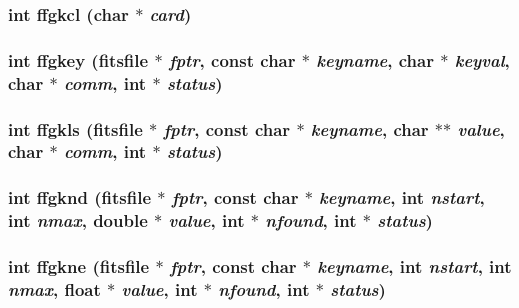 \subsubsection{\setlength{\rightskip}{0pt plus 5cm}int ffgkcl (char $\ast$ {\em card})}\label{src_2fitsio_8h_89eaf0da53af08c1e07b6940a3ebdf32}


\subsubsection{\setlength{\rightskip}{0pt plus 5cm}int ffgkey (\bf{fitsfile} $\ast$ {\em fptr}, const char $\ast$ {\em keyname}, char $\ast$ {\em keyval}, char $\ast$ {\em comm}, int $\ast$ {\em status})}\label{src_2fitsio_8h_9a92da40129953d96be3d75a06ee8b8a}


\subsubsection{\setlength{\rightskip}{0pt plus 5cm}int ffgkls (\bf{fitsfile} $\ast$ {\em fptr}, const char $\ast$ {\em keyname}, char $\ast$$\ast$ {\em value}, char $\ast$ {\em comm}, int $\ast$ {\em status})}\label{src_2fitsio_8h_ffb87d66b7458265f69a1989575b4c0c}


\subsubsection{\setlength{\rightskip}{0pt plus 5cm}int ffgknd (\bf{fitsfile} $\ast$ {\em fptr}, const char $\ast$ {\em keyname}, int {\em nstart}, int {\em nmax}, double $\ast$ {\em value}, int $\ast$ {\em nfound}, int $\ast$ {\em status})}\label{src_2fitsio_8h_bd018a9bcb045ffaedb09fd79c311736}


\subsubsection{\setlength{\rightskip}{0pt plus 5cm}int ffgkne (\bf{fitsfile} $\ast$ {\em fptr}, const char $\ast$ {\em keyname}, int {\em nstart}, int {\em nmax}, float $\ast$ {\em value}, int $\ast$ {\em nfound}, int $\ast$ {\em status})}\label{src_2fitsio_8h_72336d055c54ad79acde9bbdf96cf8d7}


